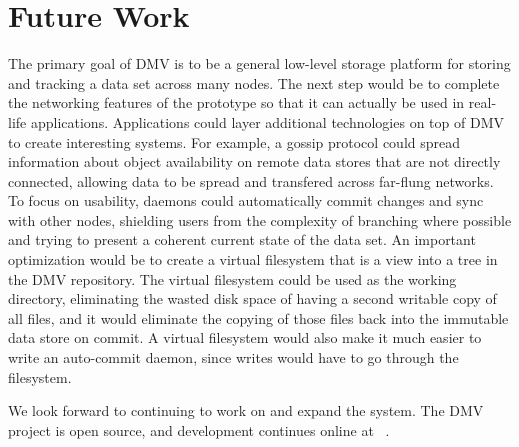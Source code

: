 \chapter{Future Work}

The primary goal of \gls{DMV} is to be a general low-level storage platform for
storing and tracking a data set across many nodes. The next step would be to
complete the networking features of the prototype so that it can actually be
used in real-life applications. Applications could layer additional technologies
on top of \gls{DMV} to create interesting systems. For example, a gossip
protocol could spread information about object availability on remote data
stores that are not directly connected, allowing data to be spread and
transfered across far-flung networks. To focus on usability, daemons could
automatically \gls{commit} changes and sync with other nodes, shielding users
from the complexity of branching where possible and trying to present a coherent
current state of the data set. An important optimization would be to create a
virtual filesystem that is a view into a \gls{tree} in the \gls{DMV} repository.
The virtual filesystem could be used as the working directory, eliminating the
wasted disk space of having a second writable copy of all files, and it would
eliminate the copying of those files back into the immutable data store on
\gls{commit}. A virtual filesystem would also make it much easier to write an
auto-\gls{commit} daemon, since writes would have to go through the filesystem.

We look forward to continuing to work on and expand the system. The \gls{DMV}
project is open source, and development continues online at \dmvurl~.
